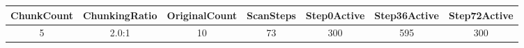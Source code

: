 \begin{table}[h]
\centering
\begin{adjustbox}{max width=\textwidth}
\begin{tabular}{ |c|c|c|c|c|c|c| }
\hline
ChunkCount & ChunkingRatio & OriginalCount & ScanSteps & Step0Active & Step36Active & Step72Active \\
\hline
5 & 2.0:1 & 10 & 73 & 300 & 595 & 300 \\
\hline
\end{tabular}
\end{adjustbox}
\end{table}
